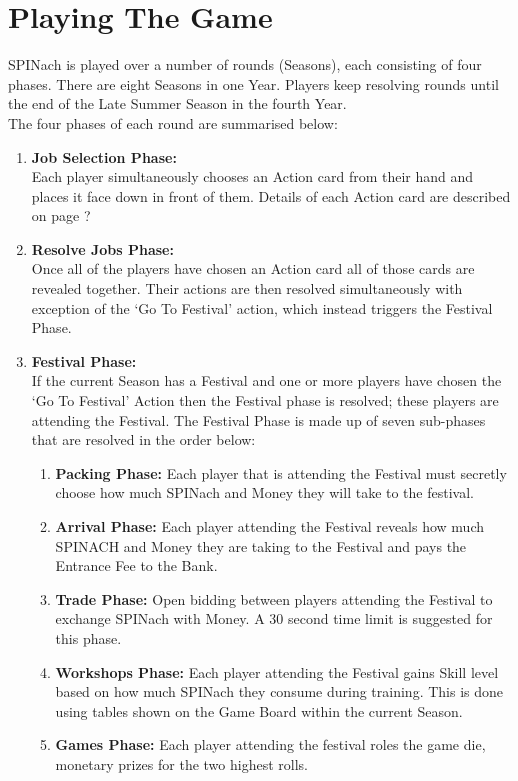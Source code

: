 \chapter{Playing The Game}
	SPINach is played over a number of rounds (Seasons), each consisting of four phases. 
	There are eight Seasons in one Year.
	Players keep resolving rounds until the end of the Late Summer Season in the fourth Year.
	\\
	The four phases of each round are summarised below:
	\begin{enumerate}
		\item \textbf{Job Selection Phase:}\hfill \\
			Each player simultaneously chooses an Action card from their hand and places it face down in front of them. Details of each Action card are described on page ?
		\item \textbf{Resolve Jobs Phase:} \hfill \\
			Once all of the players have chosen an Action card all of those cards are revealed together. Their actions are then resolved simultaneously with exception of the `Go To Festival' action, which instead triggers the Festival Phase.
		\item \textbf{Festival Phase:} \hfill \\
			If the current Season has a Festival and one or more players have chosen the `Go To Festival' Action then the Festival phase is resolved; these players are attending the Festival.
			The Festival Phase is made up of seven sub-phases that are resolved in the order below:
		\begin{enumerate}[I]
			\item \textbf{Packing Phase:} Each player that is attending the Festival must secretly choose how much SPINach and Money they will take to the festival.
			\item \textbf{Arrival Phase:} Each player attending the Festival reveals how much SPINACH and Money they are taking to the Festival and pays the Entrance Fee to the Bank.
			\item \textbf{Trade Phase:} Open bidding between players attending the Festival to exchange SPINach with Money. A 30 second time limit is suggested for this phase.
			\item \textbf{Workshops Phase:} Each player attending the Festival gains Skill level based on how much SPINach they consume during training. This is done using tables shown on the Game Board within the current Season.
			\item \textbf{Games Phase:} Each player attending the festival roles the game die, monetary prizes for the two highest rolls. 

\end{enumerate}
\end{enumerate}
